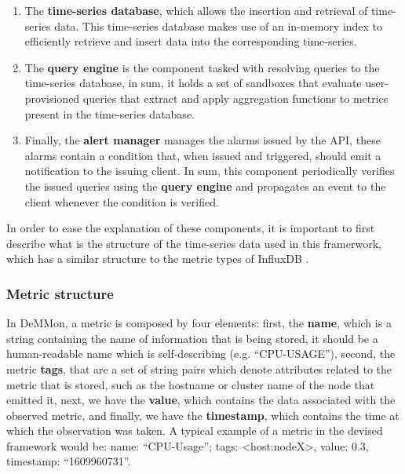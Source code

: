 \begin{enumerate}
    
    \item The \textbf{time-series database}, which allows the insertion and retrieval of time-series data. This time-series database makes use of an in-memory index to efficiently retrieve and insert data into the corresponding time-series.

    \item The \textbf{query engine} is the component tasked with resolving queries to the time-series database, in sum, it holds a set of sandboxes that evaluate user-provisioned queries that extract and apply aggregation functions to metrics present in the time-series database.
    
    \item Finally, the \textbf{alert manager} manages the alarms issued by the API, these alarms contain a condition that, when issued and triggered, should emit a notification to the issuing client. In sum, this component periodically verifies the issued queries using the \textbf{query engine} and propagates an event to the client whenever the condition is verified.
     
\end{enumerate}

In order to ease the explanation of these components, it is important to first describe what is the structure of the time-series data used in this framerwork, which has a similar structure to the metric types of InfluxDB . 

\subsubsection{Metric  structure}

In DeMMon, a metric is composed by four elements: first, the \textbf{name}, which is a string containing the name of information that is being stored, it should be a human-readable name which is self-describing (e.g. ``CPU-USAGE''), second, the metric \textbf{tags}, that are a set of string pairs which denote attributes related to the metric that is stored, such as the hostname or cluster name of the node that emitted it, next, we have the \textbf{value}, which contains the data associated with the observed metric, and finally, we have the  \textbf{timestamp}, which contains the time at which the observation was taken. A typical example of a metric in the devised framework would be: name: ``CPU-Usage''; tags: <host:nodeX>, value: 0.3, timestamp: ``1609960731''.

